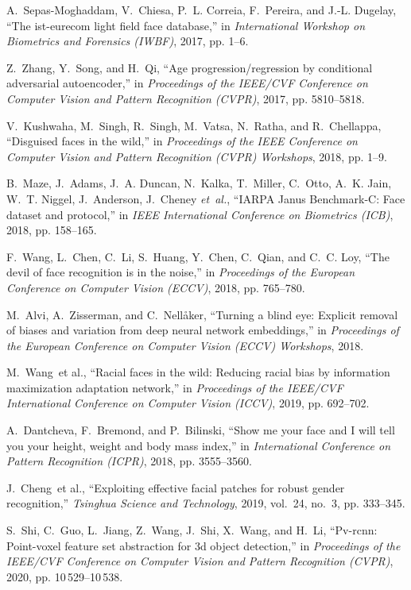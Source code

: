 \documentclass[journal]{IEEEtran}
\begin{document}
\begin{thebibliography}{100}
A.~Sepas-Moghaddam, V.~Chiesa, P.~L. Correia, F.~Pereira, and J.-L. Dugelay,
``The ist-eurecom light field face database,'' in \emph{International Workshop on Biometrics and Forensics (IWBF)}, 2017, pp. 1--6.

Z.~Zhang, Y.~Song, and H.~Qi, ``Age progression/regression by conditional adversarial autoencoder,'' in \emph{Proceedings of the IEEE/CVF Conference on Computer Vision and Pattern Recognition (CVPR)}, 2017, pp. 5810--5818.

V.~Kushwaha, M.~Singh, R.~Singh, M.~Vatsa, N.~Ratha, and R.~Chellappa, ``Disguised faces in the wild,'' in \emph{Proceedings of the IEEE Conference on Computer Vision and Pattern Recognition (CVPR) Workshops}, 2018, pp. 1--9.

B.~Maze, J.~Adams, J.~A. Duncan, N.~Kalka, T.~Miller, C.~Otto, A.~K. Jain,
W.~T. Niggel, J.~Anderson, J.~Cheney \emph{et~al.}, ``IARPA Janus Benchmark-C: Face dataset and protocol,'' in \emph{IEEE International Conference on Biometrics (ICB)}, 2018, pp. 158--165.

F.~Wang, L.~Chen, C.~Li, S.~Huang, Y.~Chen, C.~Qian, and C.~C. Loy, ``The devil of face recognition is in the noise,'' in \emph{Proceedings of the European
Conference on Computer Vision (ECCV)}, 2018, pp. 765--780.

M.~Alvi, A.~Zisserman, and C.~Nell{\aa}ker, ``Turning a blind eye: Explicit removal of biases and variation from deep neural network embeddings,'' in
\emph{Proceedings of the European Conference on Computer Vision (ECCV) Workshops}, 2018.

M.~Wang~et al., ``Racial faces in the wild: Reducing racial bias by information maximization adaptation network,'' in \emph{Proceedings of the IEEE/CVF International Conference on Computer Vision (ICCV)}, 2019, pp. 692--702.

A.~Dantcheva, F.~Bremond, and P.~Bilinski, ``Show me your face and I will tell you your height, weight and body mass index,'' in \emph{International Conference on Pattern Recognition (ICPR)}, 2018, pp. 3555--3560.

J.~Cheng~et al., ``Exploiting effective facial patches for robust gender recognition,'' \emph{Tsinghua Science and Technology}, 2019, vol.~24, no.~3, pp.
333--345.

S.~Shi, C.~Guo, L.~Jiang, Z.~Wang, J.~Shi, X.~Wang, and H.~Li, ``Pv-rcnn: Point-voxel feature set abstraction for 3d object detection,'' in \emph{Proceedings of the IEEE/CVF Conference on Computer Vision and Pattern Recognition (CVPR)}, 2020, pp. 10\,529--10\,538.


\end{thebibliography}
\end{document}

